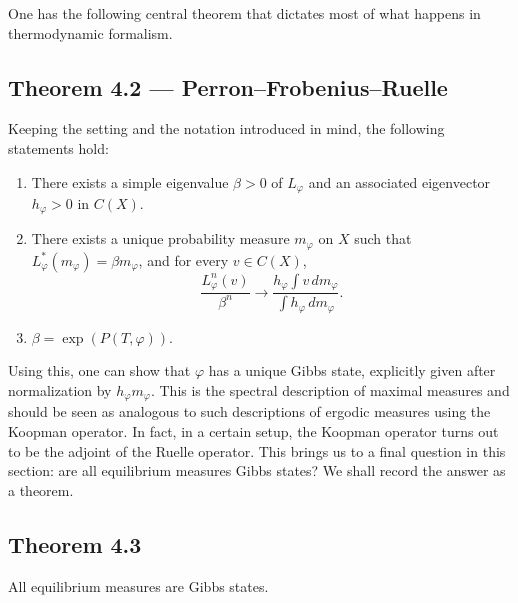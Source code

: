 \documentclass[11pt,a4paper]{article}
\begin{document}
One has the following central theorem that dictates most of what happens in
thermodynamic formalism.

\subsection*{Theorem 4.2 --- Perron--Frobenius--Ruelle}
Keeping the setting and the notation introduced in mind, the following statements hold:
\begin{enumerate}
    \item There exists a simple eigenvalue $\beta>0$ of $L_\varphi$ and an associated eigenvector $h_\varphi>0$ in $C(X)$.
    \item There exists a unique probability measure $m_\varphi$ on $X$ such that $L_\varphi^*(m_\varphi)=\beta m_\varphi$, and for every $v\in C(X)$,
    \[
    \frac{L_\varphi^n(v)}{\beta^n}
    \longrightarrow
    \frac{h_\varphi\int v\,dm_\varphi}{\int h_\varphi\,dm_\varphi}.
    \]
    \item $\beta=\exp(P(T,\varphi))$.
\end{enumerate}

Using this, one can show that $\varphi$ has a unique Gibbs state, explicitly
given after normalization by $h_\varphi m_\varphi$. This is the spectral
description of maximal measures and should be seen as analogous to such
descriptions of ergodic measures using the Koopman operator. In fact, in a
certain setup, the Koopman operator turns out to be the adjoint of the Ruelle
operator. This brings us to a final question in this section: are all
equilibrium measures Gibbs states? We shall record the answer as a theorem.

\subsection*{Theorem 4.3}
All equilibrium measures are Gibbs states.
\end{document}
